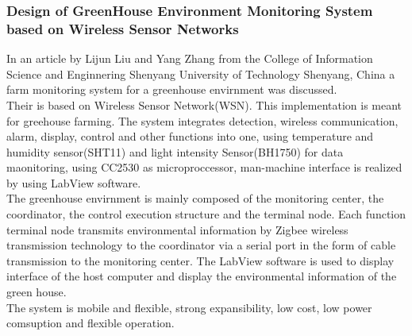 \documentclass[12pt, a4paper]{article}
\begin{document}
\subsubsection{Design of GreenHouse Environment Monitoring System based on Wireless Sensor Networks}
In an article by Lijun Liu and Yang Zhang \cite{liu2017design} from the College of Information Science and Enginnering Shenyang University of Technology Shenyang, China a farm monitoring system for a greenhouse envirnment was discussed.\\
Their is based on Wireless Sensor Network(WSN). This implementation is meant for greehouse farming. The system integrates detection, wireless communication, alarm, display, control and other functions into one, using temperature and humidity sensor(SHT11) and light intensity Sensor(BH1750) for data maonitoring, using CC2530 as microproccessor, man-machine interface is realized by using LabView software.\\ 
The greenhouse envirnment is mainly composed of the monitoring center, the coordinator, the control execution structure and the terminal node. Each function terminal node  transmits environmental information by Zigbee wireless transmission technology to the coordinator via a serial port in the form of cable transmission to the monitoring center. The LabView software is used to display interface of the host computer and display the environmental information of the green house. \\
The system is mobile and flexible, strong expansibility, low cost, low power comsuption and flexible operation.
\end{document}
